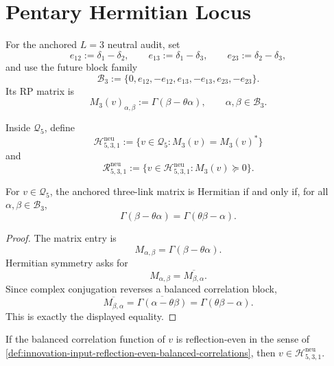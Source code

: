 \section{Pentary Hermitian Locus}
\label{sec:innovation-input-pentary-hermitian-locus}

\begin{definition}
\label{def:innovation-input-anchored-three-link-neutral-window}
For the anchored $L=3$ neutral audit, set
$$
e_{12}:=\delta_1-\delta_2,
\qquad
e_{13}:=\delta_1-\delta_3,
\qquad
e_{23}:=\delta_2-\delta_3,
$$
and use the future block family
$$
\mathcal B_3
:=
\{0,e_{12},-e_{12},e_{13},-e_{13},e_{23},-e_{23}\}.
$$
Its RP matrix is
$$
M_3(v)_{\alpha,\beta}
:=
\Gamma(\beta-\theta\alpha),
\qquad
\alpha,\beta\in\mathcal B_3.
$$
\end{definition}

\begin{definition}
\label{def:innovation-input-pentary-hermitian-rp-loci}
Inside $\mathcal Q_5$, define
$$
\mathcal H_{5,3,1}^{\mathrm{neu}}
:=
\{v\in\mathcal Q_5:M_3(v)=M_3(v)^*\}
$$
and
$$
\mathcal R_{5,3,1}^{\mathrm{neu}}
:=
\{v\in\mathcal H_{5,3,1}^{\mathrm{neu}}:M_3(v)\succeq0\}.
$$
\end{definition}

\begin{theorem}
\label{thm:innovation-input-hermitian-reflected-correlation-equality}
For $v\in\mathcal Q_5$, the anchored three-link matrix is Hermitian if
and only if, for all $\alpha,\beta\in\mathcal B_3$,
$$
\Gamma(\beta-\theta\alpha)
=
\Gamma(\theta\beta-\alpha).
$$
\end{theorem}

\begin{proof}
The matrix entry is
$$
M_{\alpha,\beta}=\Gamma(\beta-\theta\alpha).
$$
Hermitian symmetry asks for
$$
M_{\alpha,\beta}=\overline{M_{\beta,\alpha}}.
$$
Since complex conjugation reverses a balanced correlation block,
$$
\overline{M_{\beta,\alpha}}
=
\overline{\Gamma(\alpha-\theta\beta)}
=
\Gamma(\theta\beta-\alpha).
$$
This is exactly the displayed equality.
\end{proof}

\begin{corollary}
\label{cor:innovation-input-reflection-even-rows-hermitian}
If the balanced correlation function of $v$ is reflection-even in the
sense of
\autoref{def:innovation-input-reflection-even-balanced-correlations}, then
$v\in\mathcal H_{5,3,1}^{\mathrm{neu}}$.
\end{corollary}

